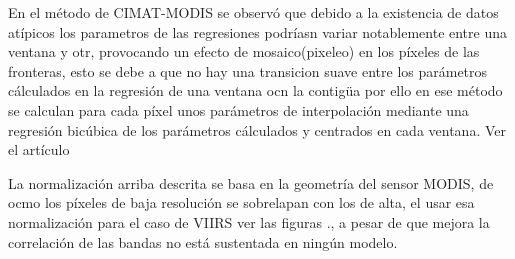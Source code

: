 En el método de CIMAT-MODIS se observó que debido a la existencia de datos atípicos los parametros de las regresiones podríasn variar notablemente entre una ventana y otr, provocando un efecto de mosaico(pixeleo) en los píxeles de las fronteras, esto se debe a que no hay una transicion suave entre los parámetros cálculados en la regresión de una ventana ocn la contigüa por ello en ese método se calculan para cada píxel unos parámetros de interpolación mediante una regresión bicúbica de los parámetros cálculados y centrados en cada ventana. Ver el artículo 


La normalización arriba descrita se basa en la geometría del sensor MODIS, de ocmo los píxeles de baja resolución se sobrelapan con los de alta, el usar esa normalización para el caso de VIIRS ver las figuras ., a pesar de que mejora la correlación de las bandas no está sustentada en ningún modelo.  